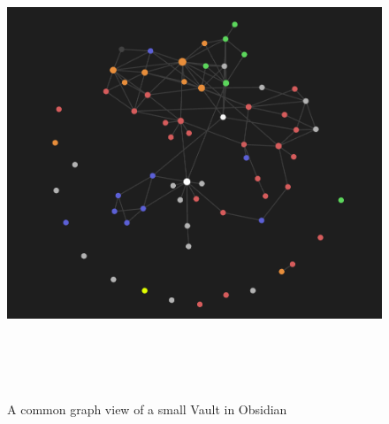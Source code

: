 \begin{figure}[p]\centering
  \includegraphics[width=140mm, height=140mm]{img/obsidian_common_notes.png}
  \caption{A common graph view of a small Vault in Obsidian}
  \label{obr:obsidian_common}
\end{figure}




